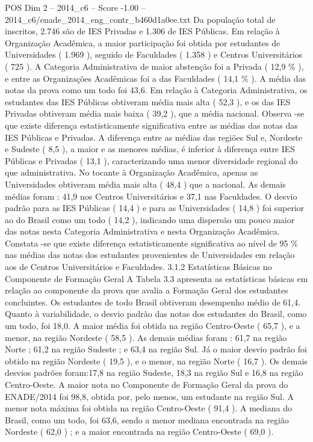 \begin{textsample}{POS Dim 2 – 2014\_c6 – Score -1.00 – 2014\_c6/enade\_2014\_eng\_contr\_b460d1a0ee.txt}
Da população total de inscritos, 2.746 são de IES Privadas e 1.306 de IES Públicas.
Em relação à Organização Acadêmica, a maior participação foi obtida por estudantes de Universidades ( 1.969 ), seguido de Faculdades ( 1.358 ) e Centros Universitários ( 725 ).
A Categoria Administrativa de maior abstenção foi a Privada ( 12,9 \% ), e entre as Organizações Acadêmicas foi a das Faculdades ( 14,1 \% ).
A média das notas da prova como um todo foi 43,6.
Em relação à Categoria Administrativa, os estudantes das IES Públicas obtiveram média mais alta ( 52,3 ), e os das IES Privadas obtiveram média mais baixa ( 39,2 ), que a média nacional.
Observa -se que existe diferença estatisticamente significativa entre as médias das notas das IES Públicas e Privadas.
A diferença entre as médias das regiões Sul e, Nordeste e Sudeste ( 8,5 ), a maior e as menores médias, é inferior à diferença entre IES Públicas e Privadas ( 13,1 ), caracterizando uma menor diversidade regional do que administrativa.
No tocante à Organização Acadêmica, apenas as Universidades obtiveram média mais alta ( 48,4 ) que a nacional.
As demais médias foram : 41,9 nos Centros Universitários e 37,1 nas Faculdades.
O desvio padrão para as IES Públicas ( 14,4 ) e para as Universidades ( 14,8 ) foi superior ao do Brasil como um todo ( 14,2 ), indicando uma dispersão um pouco maior das notas nesta Categoria Administrativa e nesta Organização Acadêmica.
Constata -se que existe diferença estatisticamente significativa ao nível de 95 \% nas médias das notas dos estudantes provenientes de Universidades em relação aos de Centros Universitários e Faculdades. 3.1.2 Estatísticas Básicas no Componente de Formação Geral A Tabela 3.3 apresenta as estatísticas básicas em relação ao componente da prova que avalia a Formação Geral dos estudantes concluintes.
Os estudantes de todo Brasil obtiveram desempenho médio de 61,4.
Quanto à variabilidade, o desvio padrão das notas dos estudantes do Brasil, como um todo, foi 18,0.
A maior média foi obtida na região Centro-Oeste ( 65,7 ), e a menor, na região Nordeste ( 58,5 ).
As demais médias foram : 61,7 na região Norte ; 61,2 na região Sudeste ; e 63,4 na região Sul.
Já o maior desvio padrão foi obtido na região Nordeste ( 19,5 ), e o menor, na região Norte ( 16,7 ).
Os demais desvios padrões foram:17,8 na região Sudeste, 18,3 na região Sul e 16,8 na região Centro-Oeste.
A maior nota no Componente de Formação Geral da prova do ENADE/2014 foi 98,8, obtida por, pelo menos, um estudante na região Sul.
A menor nota máxima foi obtida na região Centro-Oeste ( 91,4 ).
A mediana do Brasil, como um todo, foi 63,6, sendo a menor mediana encontrada na região Nordeste ( 62,0 ) ; e a maior encontrada na região Centro-Oeste ( 69,0 ).

\end{textsample}
